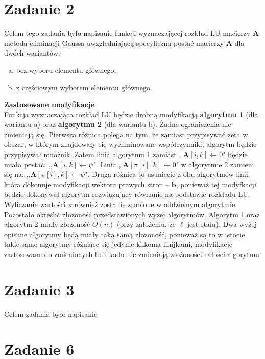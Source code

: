\documentclass[]{article}
\newcommand{\mA}{\bm{A}}
\newcommand{\vb}{\bm{b}}
\begin{document}
	\section*{Zadanie 2} 
	
	Celem tego zadania było napisanie funkcji wyznaczającej rozkład LU macierzy $\mA$ metodą eliminacji Gaussa uwzględniającą
	specyficzną postać macierzy $\mA$ dla dwóch wariantów:
	\begin{enumerate}[a)]
		\item bez wyboru elementu głównego,
		\item z częściowym wyborem elementu głównego.
	\end{enumerate}
	\textbf{Zastosowane modyfikacje}\\
	Funkcja wyznaczająca rozkład LU będzie drobną modyfikacją \textbf{algorytmu 1} (dla wariantu a) oraz \textbf{algorytmu 2} (dla wariantu b). Żadne ograniczenia nie zmieniają się. Pierwsza różnica polega na tym, że zamiast przypisywać zera w obszar, w którym znajdowały się wyeliminowane współczynniki, algorytm będzie przypisywał mnożnik. 
	Zatem linia algorytmu 1 zamiast ,,$\mA[i,k] \gets 0 $" będzie miała postać: ,,$\mA[i,k] \gets \psi $". Linia ,,$\mA[\pi[i],k] \gets 0 $" w algorytmie 2 zamieni się na: ,,$\mA[\pi[i],k] \gets \psi $".
	Druga różnica to usunięcie z obu algorytmów linii, która dokonuje modyfikacji wektora prawych stron -- $\vb$, ponieważ tej modyfkacji będzie dokonywał algorytm rozwiązujący równanie na podstawie rozkładu LU. Wyliczanie wartości x również zostanie zrobione w oddzielnym algorytmie.\\
	Pozostało określić złożoność przedstawionych wyżej algorytmów. Algorytm 1 oraz algorytm 2 miały złożoność $O(n)$ (przy założeniu, że $\ell$ jest stałą). Dwa wyżej opisane algorytmy będą miały taką samą złożoność, ponieważ są to w istocie takie same algorytmy różniące się jedynie kilkoma linijkami, modyfikacje zastosowane do zmienionych linii kodu nie zmieniają złożoności całości algorytmu.
	
	\clearpage
	
	\section*{Zadanie 3}

	Celem zadania było napisanie 
	
	\section*{Zadanie 6}
	
\end{document}
